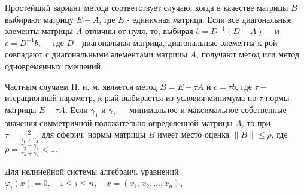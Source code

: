 \documentclass[10pt]{article}
\begin{document}
Простейший вариант метода соответствует случаю, когда в качестве матрицы $B$ выбирают матрицу $E-A$, где $E$ - единичная матрица. Если все диагональные элементы матрицы $A$ отличны от нуля, то, выбирая $b=D^{-1}(D-A) \quad$ и $c=D^{-1} b, \quad$ где $D$ - диагональная матрица, диагональные әлементы к-рой совпадают с диагональными әлементами матрицы $A$, получают метод или метод одновременных смещений.



Частным случаем П. и. м. является метод $B=E-\tau A$ и $c=\tau b$, где $\tau-$ итерационный параметр, к-рый выбирается из условия минимума по $\tau$ нормы матрицы $E-\tau A$. Если $\gamma_{1}$ и $\gamma_{2}-$ минимальное и максимальное собственные значения симметричной положительно определенной матрицы $A$, то при $\tau=\frac{2}{\gamma_{1}+\gamma_{2}}$ для сферич. нормы матрицы $B$ имеет место оценка $\|B\| \leqslant \rho$, где $\rho=\frac{\gamma_{2}-\gamma_{1}}{\gamma_{2}+\gamma_{1}}<1$.



Для нелинейной системы алгебраич. уравнений $\varphi_{i}(x)=0, \quad 1 \leqslant i \leqslant n, \quad x=\left(x_{1}, x_{2}, \ldots, x_{n}\right)$,
\end{document}

